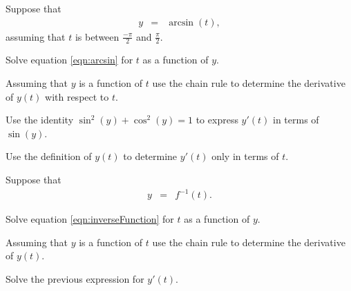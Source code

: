 \begin{problem}
\item Suppose that
  \begin{eqnarray}
    \label{eqn:arcsin}
    y &= & \arcsin(t),
  \end{eqnarray}
  assuming that $t$ is between $\frac{-\pi}{2}$ and $\frac{\pi}{2}$.
  \begin{subproblem}
  \item Solve equation \ref{eqn:arcsin} for $t$ as a function of
    $y$.
    \vfill
  \item Assuming that $y$ is a function of $t$ use the chain rule to
    determine the derivative of $y(t)$ with respect to $t$.  
    \vfill
  \item Use the identity $\sin^2(y)+\cos^2(y)=1$ to express $y'(t)$ in
    terms of $\sin(y)$.  
    \vfill
  \item Use the definition of $y(t)$ to determine $y'(t)$ only in
    terms of $t$.  
    \vfill

  \end{subproblem}

  \clearpage

\item Suppose that
  \begin{eqnarray}
    \label{eqn:inverseFunction}
    y &= & f^{-1}(t).
  \end{eqnarray}
  \begin{subproblem}
  \item Solve equation \ref{eqn:inverseFunction} for $t$ as a function
    of $y$.
    \vfill

  \item Assuming that $y$ is a function of $t$ use the chain rule to
    determine the derivative of $y(t)$.  
    \vfill

  \item Solve the previous expression for $y'(t)$.
    \vfill

  \end{subproblem}


\end{problem}

\postClass

